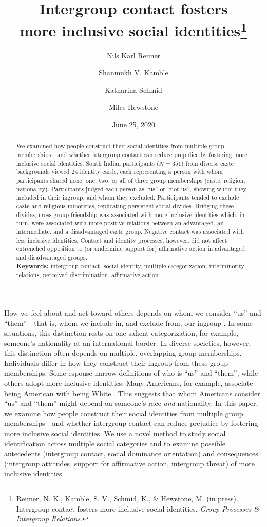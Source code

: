 \documentclass[12pt, a4paper]{article}
\title{Intergroup contact fosters\\more inclusive social identities\thanks{Reimer, N. K., Kamble, S. V., Schmid, K., \& Hewstone, M. (in press). Intergroup contact fosters more inclusive social identities. \textit{Group Processes \& Intergroup Relations.}}}
\author[1]{Nils Karl Reimer}
\author[2]{Shanmukh V. Kamble}
\author[3]{Katharina Schmid}
\author[1]{Miles Hewstone}
\affil[1]{University of Oxford, United Kingdom}
\affil[2]{Karnatak University Dharwad, India}
\affil[3]{Universitat Ramon Llull, ESADE Business School, Spain}
\date{June 25, 2020}
\begin{document}
\maketitle

\begin{abstract}
\noindent We examined how people construct their social identities from multiple group memberships---and whether intergroup contact can reduce prejudice by fostering more inclusive social identities. South Indian participants ($N = 351$) from diverse caste backgrounds viewed 24 identity cards, each representing a person with whom participants shared none, one, two, or all of three group memberships (caste, religion, nationality). Participants judged each person as “us” or “not us”, showing whom they included in their ingroup, and whom they excluded. Participants tended to exclude caste and religious minorities, replicating persistent social divides. Bridging these divides, cross-group friendship was associated with more inclusive identities which, in turn, were associated with more positive relations between an advantaged, an intermediate, and a disadvantaged caste group. Negative contact was associated with less inclusive identities. Contact and identity processes, however, did not affect entrenched opposition to (or undermine support for) affirmative action in advantaged and disadvantaged groups.\\[1ex]
\noindent \textbf{Keywords:} intergroup contact, social identity, multiple categorization, interminority relations, perceived discrimination, affirmative action \\[1ex]
\end{abstract}

\noindent How we feel about and act toward others depends on whom we consider “us” and “them”---that is, whom we include in, and exclude from, our ingroup \parencite[for a review, see][]{reimer_self-categorization_2020}. In some situations, this distinction rests on one salient categorization, for example, someone’s nationality at an international border. In diverse societies, however, this distinction often depends on multiple, overlapping group memberships. Individuals differ in how they construct their ingroup from these group memberships. Some espouse narrow definitions of who is “us” and “them”, while others adopt more inclusive identities. Many Americans, for example, associate being American with being White \parencite{devos_american_2005}. This suggests that whom Americans consider “us” and “them” might depend on someone’s race \emph{and} nationality. In this paper, we examine how people construct their social identities from multiple group memberships---and whether intergroup contact can reduce prejudice by fostering more inclusive social identities. We use a novel method to study social identification across multiple social categories and to examine possible antecedents (intergroup contact, social dominance orientation) and consequences (intergroup attitudes, support for affirmative action, intergroup threat) of more inclusive identities.
\end{document}
